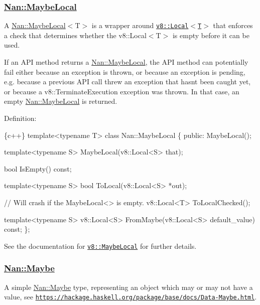 \label{_api_nan_maybe_local}%
 \subsubsection*{\hyperlink{class_nan_1_1_maybe_local}{Nan\+::\+Maybe\+Local}}

A {\ttfamily \hyperlink{class_nan_1_1_maybe_local}{Nan\+::\+Maybe\+Local}$<$T$>$} is a wrapper around \href{https://v8docs.nodesource.com/io.js-3.0/de/deb/classv8_1_1_local.html}{\tt {\ttfamily v8\+::\+Local$<$T$>$}} that enforces a check that determines whether the {\ttfamily v8\+::\+Local$<$T$>$} is empty before it can be used.

If an A\+PI method returns a {\ttfamily \hyperlink{class_nan_1_1_maybe_local}{Nan\+::\+Maybe\+Local}}, the A\+PI method can potentially fail either because an exception is thrown, or because an exception is pending, e.\+g. because a previous A\+PI call threw an exception that hasn\textquotesingle{}t been caught yet, or because a {\ttfamily v8\+::\+Terminate\+Execution} exception was thrown. In that case, an empty {\ttfamily \hyperlink{class_nan_1_1_maybe_local}{Nan\+::\+Maybe\+Local}} is returned.

Definition\+:


\begin{DoxyCode}
\{c++\}
template<typename T> class Nan::MaybeLocal \{
 public:
  MaybeLocal();

  template<typename S> MaybeLocal(v8::Local<S> that);

  bool IsEmpty() const;

  template<typename S> bool ToLocal(v8::Local<S> *out);

  // Will crash if the MaybeLocal<> is empty.
  v8::Local<T> ToLocalChecked();

  template<typename S> v8::Local<S> FromMaybe(v8::Local<S> default\_value) const;
\};
\end{DoxyCode}


See the documentation for \href{https://v8docs.nodesource.com/io.js-3.0/d8/d7d/classv8_1_1_maybe_local.html}{\tt {\ttfamily v8\+::\+Maybe\+Local}} for further details.

\label{_api_nan_maybe}%
 \subsubsection*{\hyperlink{class_nan_1_1_maybe}{Nan\+::\+Maybe}}

A simple {\ttfamily \hyperlink{class_nan_1_1_maybe}{Nan\+::\+Maybe}} type, representing an object which may or may not have a value, see \href{https://hackage.haskell.org/package/base/docs/Data-Maybe.html}{\tt https\+://hackage.\+haskell.\+org/package/base/docs/\+Data-\/\+Maybe.\+html}.

